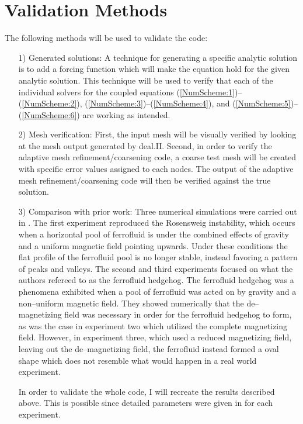 \documentclass[11pt,fullpage]{article}
\theoremstyle{lemma}
\theoremstyle{definition}
\theoremstyle{lemma}
\begin{document}
\section{Validation Methods}
The following methods will be used to validate the code:
\begin{itemize}
	\item[1)] Generated solutions: A technique for generating a specific analytic solution is to add a forcing function which will make the equation hold for the given analytic solution. This technique will be used to verify that each of the individual solvers for the coupled equations (\ref{NumScheme:1})--(\ref{NumScheme:2}), (\ref{NumScheme:3})--(\ref{NumScheme:4}), and (\ref{NumScheme:5})--(\ref{NumScheme:6}) are working as intended.
	
	\item[2)] Mesh verification: First, the input mesh will be visually verified by looking at the mesh output generated by deal.II. Second, in order to verify the adaptive mesh refinement/coarsening code, a coarse test mesh will be created with specific error values assigned to each nodes. The output of the adaptive mesh refinement/coarsening code will then be verified against the true solution.
	
	\item[3)] Comparison with prior work: Three numerical simulations were carried out in \cite{DiffuseInterface}. The first experiment reproduced the Rosensweig instability, which occurs when a horizontal pool of ferrofluid is under the combined effects of gravity and a uniform magnetic field pointing upwards. Under these conditions the flat profile of the ferrofluid pool is no longer stable, instead favoring a pattern of peaks and valleys. The second and third experiments focused on what the authors refereed to as the ferrofluid hedgehog. The ferrofluid hedgehog was a phenomena exhibited when a pool of ferrofluid was acted on by gravity and a non--uniform magnetic field. They showed numerically that the de--magnetizing field was necessary in order for the ferrofluid hedgehog to form, as was the case in experiment two which utilized the complete magnetizing field. However, in experiment three, which used a reduced magnetizing field, leaving out the de--magnetizing field, the ferrofluid instead formed a oval shape which does not resemble what would happen in a real world experiment.
	
	In order to validate the whole code, I will recreate the results described above. This is possible since detailed parameters were given in \cite{DiffuseInterface} for each experiment.
\end{itemize}
\end{document}
